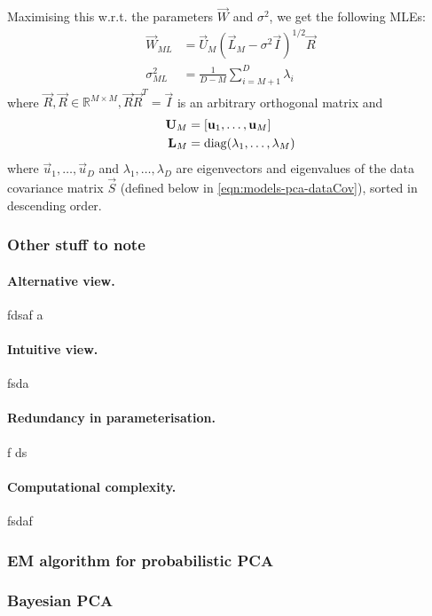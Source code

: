 Maximising this w.r.t. the parameters $\vec W$ and $\sigma^2$, we get the following MLEs:
\begin{align*}
    \vec W_{ML}     &= \vec U_M \left(\vec L_M - \sigma^2 \vec I \right)^{1 / 2} \vec R \\
    \sigma^2_{ML}   &= \frac{1}{D - M} \sum_{i = M + 1}^D \lambda_i
\end{align*}
where $\vec R, \vec R \in \mathbb R^{M \times M}, \vec R \vec R^T = \vec I$ is an arbitrary orthogonal matrix and
\begin{align*}
    \boldsymbol{\mathbf{U}}_M    &= \left[\boldsymbol{\mathbf{u}}_1, \dotsc, \boldsymbol{\mathbf{u}}_M \right] \\
    \boldsymbol{\mathbf{L}}_M    &= \operatorname{diag}(\lambda_1, \dotsc, \lambda_M)
\end{align*}
where $\vec u_1, \dotsc, \vec u_D$ and $\lambda_1, \dotsc, \lambda_D$ are eigenvectors and eigenvalues of the data covariance matrix $\vec S$ (defined below in \eqref{eqn:models-pca-dataCov}), sorted in descending order.

\subsubsection{Other stuff to note}
\paragraph{Alternative view.} fdsaf a
\paragraph{Intuitive view.} fsda 
\paragraph{Redundancy in parameterisation.} f ds
\paragraph{Computational complexity.}  fsdaf 

\subsubsection{EM algorithm for probabilistic PCA} 
\subsubsection{Bayesian PCA}
